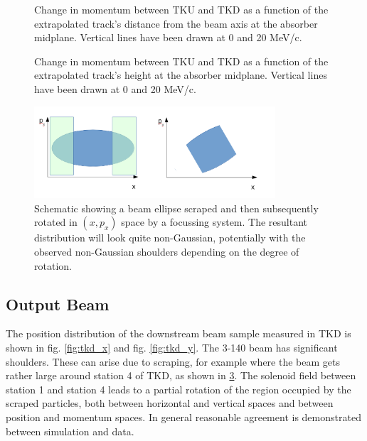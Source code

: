\begin{figure}[!tbh]
    \centering
    {Change in momentum between TKU and TKD as a function of the extrapolated
    track's distance from the beam axis at the absorber midplane. Vertical lines
    have been drawn at 0 and 20 MeV/c. \label{fig:dp_vs_r_abs}}
\end{figure}

\begin{figure}[!tbh]
    \centering
    {Change in momentum between TKU and TKD as a function of the extrapolated
    track's height at the absorber midplane. Vertical lines
    have been drawn at 0 and 20 MeV/c. \label{fig:dp_vs_y_abs}}
\end{figure}

\begin{figure}[!tbh]
    \centering
    \includegraphics[width=0.8\textwidth]{04-Cooling-Channel/Figures/scraping_schematic.png}
    \caption{Schematic showing a beam ellipse scraped and then subsequently
    rotated in $(x, p_x)$ space by a focussing system. The resultant distribution
    will look quite non-Gaussian, potentially with the observed non-Gaussian 
    shoulders depending on the degree of rotation.\label{fig:scraping_schematic}}
\end{figure}

\subsection{Output Beam}
The position distribution of the downstream beam sample measured in TKD is shown 
in fig. \ref{fig:tkd_x} and fig. \ref{fig:tkd_y}. The 3-140 beam has significant 
shoulders. These can arise due to scraping, for example where the beam gets 
rather large around station 4 of TKD, as shown in \ref{fig:scraping_schematic}. 
The solenoid field between station 1 and
station 4 leads to a partial rotation of the region occupied by the scraped 
particles, both between horizontal and vertical spaces and between position and
momentum spaces. In general reasonable agreement is demonstrated between
simulation and data.

